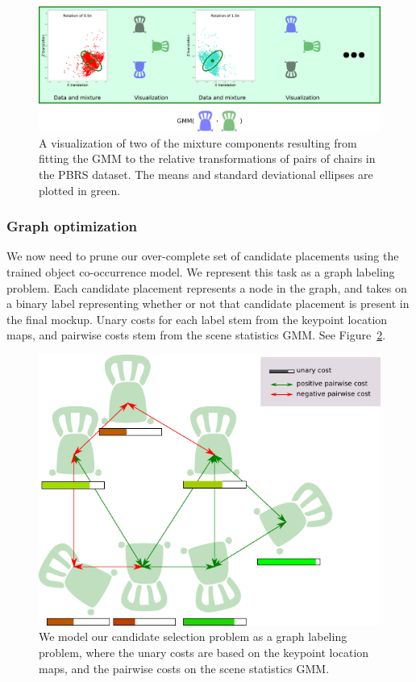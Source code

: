 \documentclass[10pt,twocolumn,letterpaper]{article}
\begin{document}
\begin{figure}
    \includegraphics[width=\linewidth]{figures/mixture_components/mixture_components}
    \caption[Mixture components]{A visualization of two of the mixture components resulting from fitting the GMM to the relative transformations of pairs of chairs in the PBRS dataset. The means and standard deviational ellipses are plotted in green.}
    \label{fig:ch4:mixture_components}
\end{figure}

\subsubsection{Graph optimization}
\label{ssec:ch4:graph_optimization}
We now need to prune our over-complete set of candidate placements using the
trained object co-occurrence model. We represent this task as a graph labeling
problem.  Each candidate placement represents a node in the graph, and takes on
a binary label representing whether or not that candidate placement is present
in the final mockup. Unary costs for each label stem from the keypoint location
maps, and pairwise costs stem from the scene statistics GMM.  See
Figure~\ref{fig:ch4:graph_example}.

\begin{figure}
    \includegraphics[width=\linewidth]{figures/graph_example/graph_example}
    \caption[Candidate selection visualization]{We model our candidate selection problem as a graph labeling problem, where the unary costs are based on the keypoint location maps, and the pairwise costs on the scene statistics GMM.}
    \label{fig:ch4:graph_example}
\end{figure}
\end{document}
